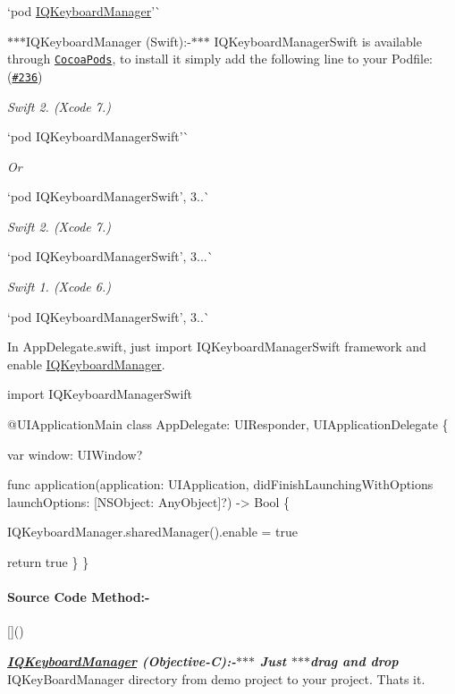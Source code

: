 `pod \textquotesingle{}\mbox{\hyperlink{interface_i_q_keyboard_manager}{I\+Q\+Keyboard\+Manager}}'\`{}

$\ast$$\ast$$\ast$\+I\+Q\+Keyboard\+Manager (Swift)\+:-\/$\ast$$\ast$$\ast$ I\+Q\+Keyboard\+Manager\+Swift is available through \href{http://cocoapods.org}{\tt Cocoa\+Pods}, to install it simply add the following line to your Podfile\+: (\href{https://github.com/hackiftekhar/IQKeyboardManager/issues/236}{\tt \#236})

{\itshape Swift 2. (Xcode 7.)}

`pod \textquotesingle{}I\+Q\+Keyboard\+Manager\+Swift'\`{}

{\itshape Or}

`pod \textquotesingle{}I\+Q\+Keyboard\+Manager\+Swift', \textquotesingle{}3..\textquotesingle{}\`{}

{\itshape Swift 2. (Xcode 7.)}

`pod \textquotesingle{}I\+Q\+Keyboard\+Manager\+Swift', \textquotesingle{}3...\textquotesingle{}\`{}

{\itshape Swift 1. (Xcode 6.)}

`pod \textquotesingle{}I\+Q\+Keyboard\+Manager\+Swift', \textquotesingle{}3..\textquotesingle{}\`{}

In App\+Delegate.\+swift, just import I\+Q\+Keyboard\+Manager\+Swift framework and enable \mbox{\hyperlink{interface_i_q_keyboard_manager}{I\+Q\+Keyboard\+Manager}}.


\begin{DoxyCode}
import IQKeyboardManagerSwift

@UIApplicationMain
class AppDelegate: UIResponder, UIApplicationDelegate \{

    var window: UIWindow?

    func application(application: UIApplication, didFinishLaunchingWithOptions launchOptions: [NSObject:
       AnyObject]?) -> Bool \{

    IQKeyboardManager.sharedManager().enable = true

    return true
    \}
\}
\end{DoxyCode}


\paragraph*{Source Code Method\+:-\/}

\mbox{[}\mbox{]}()

{\itshape {\bfseries \mbox{\hyperlink{interface_i_q_keyboard_manager}{I\+Q\+Keyboard\+Manager}} (Objective-\/C)\+:-\/$\ast$$\ast$$\ast$ Just $\ast$$\ast$$\ast$drag and drop}} {\ttfamily I\+Q\+Key\+Board\+Manager} directory from demo project to your project. That\textquotesingle{}s it.

